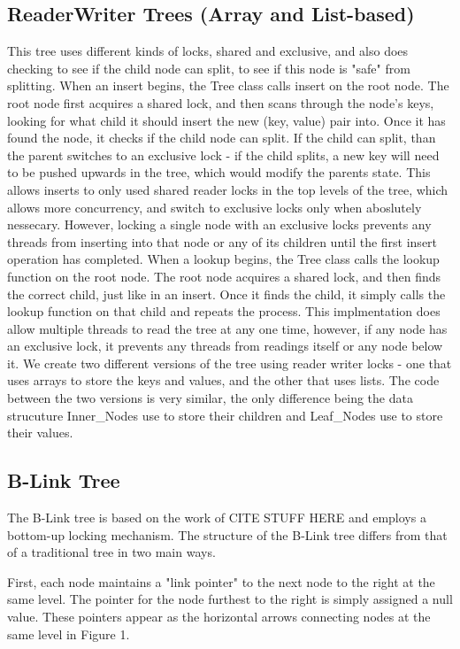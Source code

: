 \documentclass{sig-alternate}
\begin{document}
\subsection{ReaderWriter Trees (Array and List-based)}
This tree uses different kinds of locks, shared and exclusive, and also does checking to see if the child node can split, to see if this node is "safe" from splitting.  
When an insert begins, the Tree class calls insert on the root node.  The root node first acquires a shared lock, and then scans through the node's keys, looking for what child it should insert the new (key, value) pair into.  Once it has found the node, it checks if the child node can split.  If the child can split, than the parent switches to an exclusive lock - if the child splits, a new key will need to be pushed upwards in the tree, which would modify the parents state.  This allows inserts to only used shared reader locks in the top levels of the tree, which allows more concurrency, and switch to exclusive locks only when aboslutely nessecary.  However, locking a single node with an exclusive locks prevents any threads from inserting into that node or any of its children until the first insert operation has completed.
When a lookup begins, the Tree class calls the lookup function on the root node. The root node acquires a shared lock, and then finds the correct child, just like in an insert. Once it finds the child, it simply calls the lookup function on that child and repeats the process.  This implmentation does allow multiple threads to read the tree at any one time, however, if any node has an exclusive lock, it prevents any threads from readings itself or any node below it.
We create two different versions of the tree using reader writer locks - one that uses arrays to store the keys and values, and the other that uses lists.  The code between the two versions is very similar, the only difference being the data strucuture Inner\_Nodes use to store their children and Leaf\_Nodes use to store their values.
\subsection{B-Link Tree}
The B-Link tree is based on the work of CITE STUFF HERE and employs a bottom-up locking mechanism. The structure of the B-Link tree differs from that of a traditional tree in two main ways.

First, each node maintains a "link pointer" to the next node to the right at the same level. The pointer for the node furthest to the right is simply assigned a null value. These pointers appear as the horizontal arrows connecting nodes at the same level in Figure 1.
\end{document}
